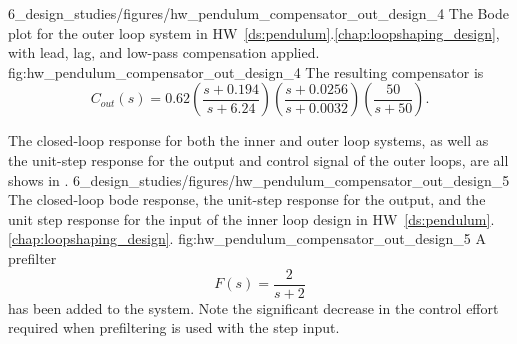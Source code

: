 %
	{6_design_studies/figures/hw_pendulum_compensator_out_design_4}
	{The Bode plot for the outer loop system in HW~\ref{ds:pendulum}.\ref{chap:loopshaping_design}, with lead, lag, and low-pass compensation applied.}
	{fig:hw_pendulum_compensator_out_design_4}
%
The resulting compensator is
\[
C_{out}(s) = 0.62\left(\frac{s+0.194}{s+6.24}\right)\left(\frac{s+0.0256}{s+0.0032}\right)\left( \frac{50}{s+50} \right).
\]


The closed-loop response for both the inner and outer loop systems, 
as well as the unit-step response for the output and control signal of the outer loops, are all shows in .
	{6_design_studies/figures/hw_pendulum_compensator_out_design_5}
	{The closed-loop bode response, the unit-step response for the output, and the unit step response for the input of the inner loop design in HW~\ref{ds:pendulum}.\ref{chap:loopshaping_design}.}
	{fig:hw_pendulum_compensator_out_design_5}
A prefilter
\[
F(s) = \frac{2}{s+2}
\]
has been added to the system. Note the significant decrease in the control effort required when prefiltering is used with the step input.

